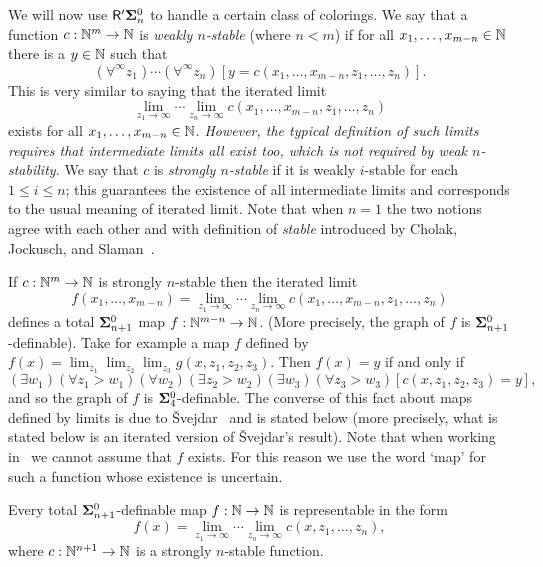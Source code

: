 We will now use $\mathsf{R}{'}{\mathbf{\Sigma}^0_n}$ to handle a certain class of colorings.
We say that a function $c:\mathbb{N}^{m}\to\mathbb{N}$ is \textit{weakly $n$-stable} (where $n<m$)
if for all $x_1,\dots,x_{m-n} \in \mathbb{N}$ there is a $y \in \mathbb{N}$ such that
\begin{equation*}
  (\forall^\infty z_1)\cdots(\forall^\infty z_n)[y = c(x_1,\dots,x_{m-n},z_1,\dots,z_n)].
\end{equation*}
This is very similar to saying that the iterated limit
\begin{equation*}
  \lim_{z_1\to\infty} \cdots \lim_{z_n\to\infty} c(x_1,\dots,x_{m-n},z_1,\dots,z_n)
\end{equation*}
exists for all $x_1,\dots,x_{m-n} \in \mathbb{N}$.
\textit{However, the typical definition of such limits
requires that intermediate limits all exist too,
which is not required by weak $n$-stability.}
We say that $c$ is \textit{strongly $n$-stable} if it is weakly $i$-stable for each $1
\leq i \leq n$; this guarantees the existence of all intermediate
limits and corresponds to the usual meaning of iterated limit.
Note that when $n = 1$ the two notions agree with each other
and with definition of \emph{stable} introduced by Cholak, Jockusch, and
Slaman~\cite{CJS}.

If $c:\mathbb{N}^{m}\to\mathbb{N}$ is strongly $n$-stable then the iterated limit
\begin{equation*}
  f(x_1,\dots,x_{m-n}) = \lim_{z_1\to\infty} \cdots \lim_{z_n\to\infty} c(x_1,\dots,x_{m-n},z_1,\dots,z_n)
\end{equation*}
defines a total $\mathbf{\Sigma}^0_{n+1}$ map $f:\mathbb{N}^{m-n}\to\mathbb{N}$.
(More precisely, the graph of $f$ is $\mathbf{\Sigma}^0_{n+1}$-definable).
Take for example a map $f$ defined by
$f(x)=\lim_{z_1}\lim_{z_2}\lim_{z_3}g(x,z_1,z_2,z_3)$.
Then $f(x)=y$ if and only if
$$(\exists w_1)(\forall z_1>w_1)(\forall w_2)(\exists z_2>w_2)(\exists w_3)(\forall z_3>w_3)[c(x,z_1,z_2,z_3)=y],$$
and so the graph of $f$ is $\mathbf{\Sigma}^0_{4}$-definable.
The converse of this fact about maps defined by limits is due
to \v{S}vejdar~\cite{Svejdar} and is stated below
(more precisely, what is stated below is an iterated version of \v{S}vejdar's result).
Note that when working in \RCAo\ we cannot assume that $f$ exists.
For this reason we use the word `map' for such a function whose existence is uncertain.


\begin{lem}\label{L:ittLimitLem}
  Every total $\mathbf{\Sigma}^0_{n+1}$-definable map $f:\mathbb{N}\to\mathbb{N}$ is
  representable in the form
  \begin{equation*}
    f(x) = \lim_{z_1\to\infty} \cdots \lim_{z_n\to\infty} c(x,z_1,\dots,z_n),
  \end{equation*}
  where $c:\mathbb{N}^{n+1}\to\mathbb{N}$ is a strongly $n$-stable function.
\end{lem}

